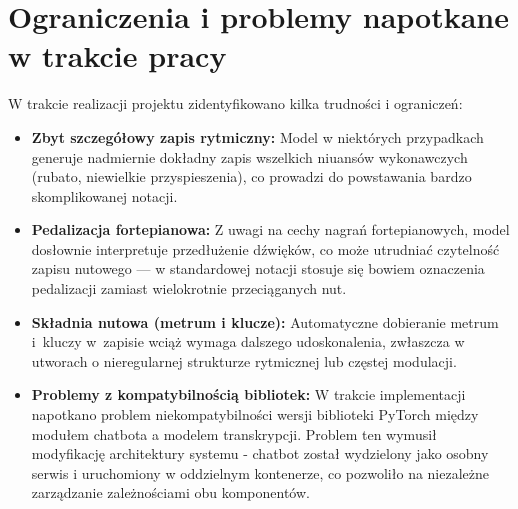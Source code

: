\documentclass[a4paper,twoside,12pt]{book}
\begin{document}
\section{Ograniczenia i problemy napotkane w trakcie pracy}
W trakcie realizacji projektu zidentyfikowano kilka trudności i ograniczeń:
\begin{itemize}
    \item \textbf{Zbyt szczegółowy zapis rytmiczny:} Model w niektórych przypadkach generuje nadmiernie dokładny zapis wszelkich niuansów wykonawczych (rubato, niewielkie przyspieszenia), co prowadzi do powstawania bardzo skomplikowanej notacji.
    \item \textbf{Pedalizacja fortepianowa:} Z uwagi na cechy nagrań fortepianowych, model dosłownie interpretuje przedłużenie dźwięków, co może utrudniać czytelność zapisu nutowego — w standardowej notacji stosuje się bowiem oznaczenia pedalizacji zamiast wielokrotnie przeciąganych nut.
    \item \textbf{Składnia nutowa (metrum i klucze):} Automatyczne dobieranie metrum i~kluczy w~zapisie wciąż wymaga dalszego udoskonalenia, zwłaszcza w utworach o nieregularnej strukturze rytmicznej lub częstej modulacji.
    \item \textbf{Problemy z kompatybilnością bibliotek:} W trakcie implementacji napotkano problem niekompatybilności wersji biblioteki PyTorch \cite{bib:pytorch} między modułem chatbota a modelem transkrypcji. Problem ten wymusił modyfikację architektury systemu - chatbot został wydzielony jako osobny serwis i uruchomiony w oddzielnym kontenerze, co pozwoliło na niezależne zarządzanie zależnościami obu komponentów.
\end{itemize}
\end{document}
